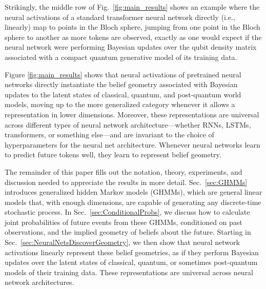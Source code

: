 \documentclass[prx,nofootinbib,onecolumn,showkeys,groupaddress,preprintnumbers,floatfix,
superscriptaddress]{revtex4-1}
\begin{document}
Strikingly, %
the middle row of Fig.~\ref{fig:main_results} shows
an example where the neural activations of a standard transformer neural network directly (i.e., linearly) 
map to %
points in the Bloch sphere, 
jumping from one point in the Bloch sphere to another as more tokens are observed,
exactly as one would expect if the neural network were performing Bayesian updates over the qubit
density matrix %
associated with a
compact quantum generative model of its training data.




Figure \ref{fig:main_results} shows that neural activations of pretrained neural networks directly instantiate the belief geometry associated with Bayesian updates to the latent states of classical, quantum, and post-quantum world models, moving up to the more generalized category whenever it allows a representation in lower dimensions.
Moreover, these representations are universal across different types of neural network architecture---whether RNNs, LSTMs, transformers, or something else---and are invariant to the choice of hyperparameters for the neural net architecture.
Whenever neural networks learn to predict future tokens well, they learn to represent belief geometry.

The remainder of this paper fills out the notation, theory, experiments, and discussion needed to appreciate the results in more detail.
Sec.~\ref{sec:GHMMs} introduces generalized hidden Markov models (GHMMs), which are general linear models 
that, with enough dimensions, are
capable of generating any discrete-time stochastic process.
In Sec.~\ref{sec:ConditionalProbs}, 
we discuss how to calculate joint probabilities of future events from these GHMMs, conditioned on past observations, and the implied geometry of beliefs about the future.  
Starting in Sec.~\ref{sec:NeuralNetsDiscoverGeometry}, we then show that neural network activations linearly represent these belief geometries, as if they perform Bayesian updates over the latent states of classical, quantum, or sometimes post-quantum models of their training data. 
These representations are universal across neural network architectures.
\end{document}

